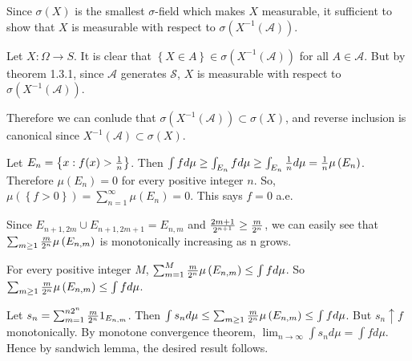 \begin{problem}[1.3.1] \hfill

	Since $\sigma\left( X \right)$ is the smallest $\sigma$-field which makes $X$ measurable, it sufficient to show that $X$ is measurable with respect to $\sigma \left ( X^{-1}\left( \mathcal{A} \right )\right)$.

	Let $X:\Omega \rightarrow S$. It is clear that $\left\{ X \in A \right\} \in \sigma\left( X^{-1} \left( \mathcal{A} \right) \right)$ for all $A \in \mathcal{A}$. But by theorem 1.3.1, since $\mathcal{A}$ generates $\mathcal{S}$, $X$ is measurable with respect to $\sigma\left( X^{-1} \left( \mathcal{A} \right) \right)$.  

	Therefore we can conlude that $\sigma\left( X^{-1}\left( \mathcal{A} \right) \right) \subset \sigma\left( X \right)$, and reverse inclusion is canonical since $X^{-1}\left( \mathcal{A} \right) \subset \sigma\left( X \right)$.
\end{problem}

\begin{problem}[1.4.1] \hfill

	Let $E_n = \left\{ x: f(x) > {1\over n} \right\}$. Then $\int f d\mu \geq \int_{E_n} f d\mu \geq \int_{E_n} {1\over n}d\mu = {1\over n}\mu\left( E_n \right)$.
	Therefore $\mu\left( E_n \right) = 0$ for every positive integer $n$. So, $\mu\left( \left\{ f > 0 \right\} \right) = \sum_{n=1}^{\infty}\mu\left( E_n \right) = 0$. This says $f = 0$ a.e.
	
\end{problem}

\begin{problem}[1.4.2]
	Since $E_{n+1, 2m} \cup E_{n+1, 2m+1} = E_{n, m}$ and ${2m+1 \over 2^{n+1}} \ge {m \over 2^{n}}$, we can easily see that $\sum_{m\geq 1}{m \over 2^n} \mu\left( E_{n, m} \right)$ is monotonically increasing as n grows.

	For every positive integer $M$, $\sum_{m = 1}^{M} {m \over 2^n} \mu\left( E_{n, m} \right) \leq \int f d\mu$. So $\sum_{m\geq 1}{m \over 2^n}\mu\left( E_{n, m} \right) \leq \int f d\mu$.

	Let $s_n = \sum_{m=1}^{n 2^n}{m \over 2^n}1_{E_{n, m}}$. Then $\int s_n d\mu \leq \sum_{m \geq 1}{m \over 2^n} \mu\left( E_{n, m} \right) \leq \int f d\mu$. 
	But $s_n \uparrow f$ monotonically. By monotone convergence theorem, $\lim_{n\rightarrow \infty}\int s_n d\mu = \int f d\mu$. Hence by sandwich lemma, the desired result follows.

\end{problem}
